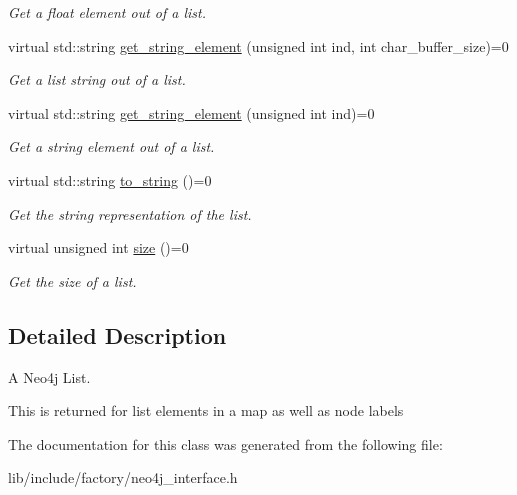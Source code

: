 \begin{DoxyCompactItemize}
\begin{DoxyCompactList}\small\item\em Get a float element out of a list. \end{DoxyCompactList}\item 
\hypertarget{classDbListInterface_ac30844705b9358941448b5ee3db91542}{virtual std\-::string \hyperlink{classDbListInterface_ac30844705b9358941448b5ee3db91542}{get\-\_\-string\-\_\-element} (unsigned int ind, int char\-\_\-buffer\-\_\-size)=0}\label{classDbListInterface_ac30844705b9358941448b5ee3db91542}

\begin{DoxyCompactList}\small\item\em Get a list string out of a list. \end{DoxyCompactList}\item 
\hypertarget{classDbListInterface_a5b56c68ef216efd371e17d65ad6adee1}{virtual std\-::string \hyperlink{classDbListInterface_a5b56c68ef216efd371e17d65ad6adee1}{get\-\_\-string\-\_\-element} (unsigned int ind)=0}\label{classDbListInterface_a5b56c68ef216efd371e17d65ad6adee1}

\begin{DoxyCompactList}\small\item\em Get a string element out of a list. \end{DoxyCompactList}\item 
\hypertarget{classDbListInterface_a18c8fd940cf2225ef9417e2b54ed0fe2}{virtual std\-::string \hyperlink{classDbListInterface_a18c8fd940cf2225ef9417e2b54ed0fe2}{to\-\_\-string} ()=0}\label{classDbListInterface_a18c8fd940cf2225ef9417e2b54ed0fe2}

\begin{DoxyCompactList}\small\item\em Get the string representation of the list. \end{DoxyCompactList}\item 
\hypertarget{classDbListInterface_a5e811b296b3bf7cea5149fce6d69138d}{virtual unsigned int \hyperlink{classDbListInterface_a5e811b296b3bf7cea5149fce6d69138d}{size} ()=0}\label{classDbListInterface_a5e811b296b3bf7cea5149fce6d69138d}

\begin{DoxyCompactList}\small\item\em Get the size of a list. \end{DoxyCompactList}\end{DoxyCompactItemize}


\subsection{Detailed Description}
A Neo4j List. 

This is returned for list elements in a map as well as node labels 

The documentation for this class was generated from the following file\-:\begin{DoxyCompactItemize}
\item 
lib/include/factory/neo4j\-\_\-interface.\-h\end{DoxyCompactItemize}
